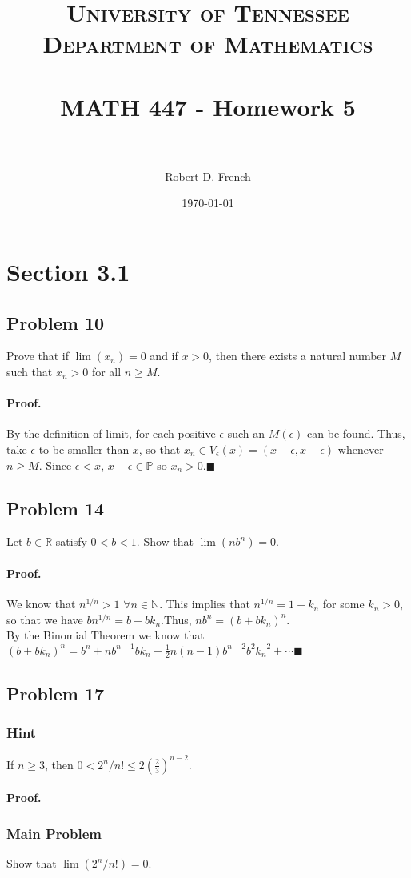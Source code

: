 \documentclass[paper=a4, fontsize=11pt]{scrartcl} %
\title{	
\normalfont \normalsize 
\textsc{University of Tennessee \\ Department of Mathematics} \\ [25pt] %
\horrule{0.5pt} \\[0.4cm] %
\huge MATH 447 - Homework 5 \\ %
\horrule{2pt} \\[0.5cm] %
}
\author{Robert D. French} %
\date{\normalsize\today} %
\numberwithin{equation}{section} %
\numberwithin{figure}{section} %
\numberwithin{table}{section} %
\begin{document}
\maketitle %


\section*{Section 3.1}

\newcommand{\prob}[1]{\subsection*{Problem {#1}}}
\newcommand{\subprob}[1]{\subsubsection*{{#1}}}
\newcommand{\pf}{\paragraph{Proof.}}
\newcommand{\done}{$\blacksquare$}

\prob{10} Prove that if $\lim(x_n) = 0$ and if $x > 0$, then there exists a natural number $M$ such that $x_n > 0$ for all $n \geq M$.

\pf By the definition of limit, for each positive $\epsilon$ such an $M(\epsilon)$ can be found. Thus, take $\epsilon$ to be smaller than $x$, so that $x_n \in V_\epsilon (x) = (x - \epsilon, x + \epsilon)$ whenever $n \geq M$. Since $\epsilon < x$, $x - \epsilon \in \mathbb{P}$ so $x_n > 0$.\done

\newcommand{\fanin}{\forall n \in \mathbb{N}}
\prob{14} Let $b \in \mathbb{R}$ satisfy $0 < b < 1$. Show that $\lim(nb^n) = 0$.

\pf We know that $n^{1/n} > 1$ $\fanin$. This implies that $n^{1/n} = 1 + k_n$ for some $k_n > 0$, so that we have $bn^{1/n} = b + b k_n$.Thus, $nb^n = (b + b k_n)^n$.\\

By the Binomial Theorem we know that $(b + b k_n)^n = b^n + n b^{n-1} b k_n + \frac{1}{2} n (n - 1) b^{n - 2} b^2 {k_n}^2 + \cdots$\done

\prob{17}
\subprob{Hint} If $n \geq 3$, then $0 < 2^n/n! \leq 2(\frac{2}{3})^{n-2}$.

\pf

\subprob{Main Problem} Show that $\lim(2^n/n!) = 0$.
\end{document}
